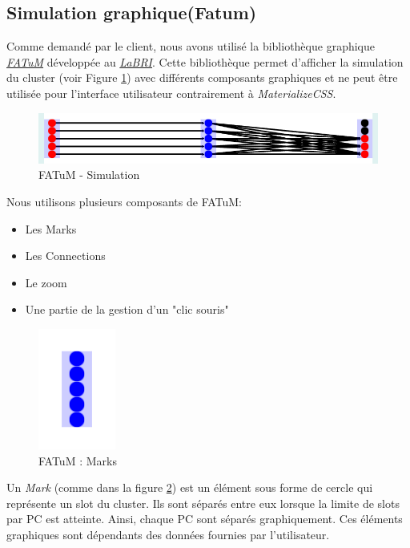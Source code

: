 \subsection{Simulation graphique(Fatum)}
Comme demandé par le client, nous avons utilisé la bibliothèque graphique \href{http://www.labri.fr/perso/aperrot/fatum/index.html}{{\it FATuM}} développée au \href{http://www.labri.fr/}{{\it LaBRI}}. Cette bibliothèque permet d'afficher la simulation du cluster (voir Figure \ref{fig:sim}) avec différents composants graphiques et ne peut être utilisée pour l'interface utilisateur contrairement à \textit{MaterializeCSS}.
\begin{figure}[H]
  \centering
    \includegraphics[scale=0.45]{images/graphiqueExemple.png}
        \caption{FATuM - Simulation}
        \label{fig:sim}
\end{figure}

Nous utilisons plusieurs composants de FATuM:
\begin{itemize}
\item Les Marks
\item Les Connections
\item Le zoom
\item Une partie de la gestion d'un "clic souris"\\
\end{itemize}

\begin{figure}[H]
  \centering
    \includegraphics[scale=0.5]{images/marks.png}
        \caption{FATuM : Marks}
        \label{fig:mark}
\end{figure}
Un {\it Mark} (comme dans la figure \ref{fig:mark}) est un élément sous forme de cercle qui représente un slot du cluster. Ils sont séparés entre eux lorsque la limite de slots par PC est atteinte. Ainsi, chaque PC sont séparés graphiquement. Ces éléments graphiques sont dépendants des données fournies par l'utilisateur.\\

